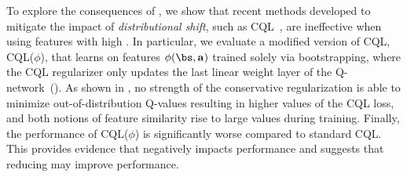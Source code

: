 To explore the consequences of \aliasingproblemname, we show that recent methods developed to mitigate the impact of \emph{distributional shift}, such as CQL~\citep{kumar2020conservative}, are ineffective when using features with high \aliasingproblemname. In particular, we evaluate a modified version of CQL, CQL($\phi$), that learns on features $\phi(\bs, \mathbf{a})$ trained solely via bootstrapping,
where the CQL regularizer only updates the last linear weight layer of the Q-network~(). As shown in , no strength of the conservative regularization is able to minimize out-of-distribution Q-values resulting in higher values of the CQL loss, and both notions of feature similarity rise to large values during training. Finally, the performance of CQL($\phi$) is significantly worse compared to standard CQL. This provides evidence that \aliasingproblemname negatively impacts performance and suggests that reducing \aliasingproblemname may improve performance.

